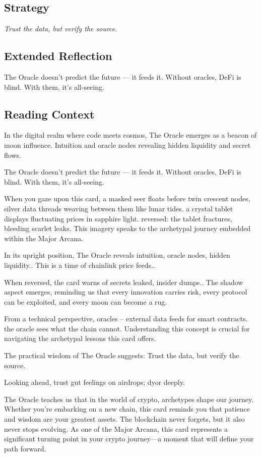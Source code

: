 \documentclass[11pt,oneside]{book}
\begin{document}
\begin{minipage}[t]{0.55\textwidth}
  \subsection*{Strategy}
  \textit{Trust the data, but verify the source.}

  \subsection*{Extended Reflection}
  The Oracle doesn't predict the future — it feeds it. Without oracles, DeFi is blind. With them, it's all-seeing.

  \subsection*{Reading Context}
  In the digital realm where code meets cosmos, The Oracle emerges as a beacon of moon influence. Intuition and oracle nodes revealing hidden liquidity and secret flows.

  The Oracle doesn't predict the future — it feeds it. Without oracles, DeFi is blind. With them, it's all-seeing.

  When you gaze upon this card, a masked seer floats before twin crescent nodes, silver data threads weaving between them like lunar tides. a crystal tablet displays fluctuating prices in sapphire light. reversed: the tablet fractures, bleeding scarlet leaks. This imagery speaks to the archetypal journey embedded within the Major Arcana.

  In its upright position, The Oracle reveals intuition, oracle nodes, hidden liquidity.. This is a time of chainlink price feeds..

  When reversed, the card warns of secrets leaked, insider dumps.. The shadow aspect emerges, reminding us that every innovation carries risk, every protocol can be exploited, and every moon can become a rug.

  From a technical perspective, oracles – external data feeds for smart contracts. the oracle sees what the chain cannot. Understanding this concept is crucial for navigating the archetypal lessons this card offers.

  The practical wisdom of The Oracle suggests: Trust the data, but verify the source.

  Looking ahead, trust gut feelings on airdrops; dyor deeply.

  The Oracle teaches us that in the world of crypto, archetypes shape our journey. Whether you're embarking on a new chain, this card reminds you that patience and wisdom are your greatest assets. The blockchain never forgets, but it also never stops evolving. As one of the Major Arcana, this card represents a significant turning point in your crypto journey—a moment that will define your path forward.

\end{minipage}
\end{document}
